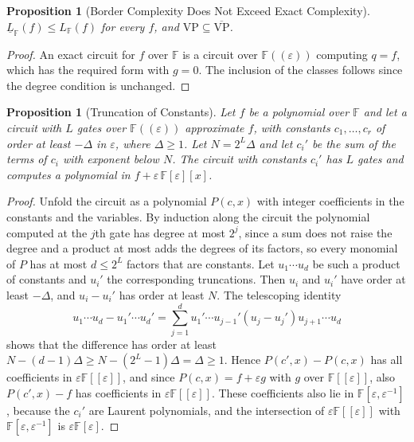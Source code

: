 \documentclass[11pt,letterpaper]{report}
\theoremstyle{plain}
\newtheorem{proposition}[theorem]{Proposition}
\theoremstyle{definition}
\theoremstyle{remark}
\newcommand{\VP}{\mathrm{VP}}
\begin{document}
\begin{proposition}[Border Complexity Does Not Exceed Exact Complexity]\label{pr:borderleq}
$\underline L_{\mathbb F}(f)\le L_{\mathbb F}(f)$ for every $f$, and $\VP\subseteq\overline{\VP}$.
\end{proposition}
\begin{proof}
An exact circuit for $f$ over $\mathbb F$ is a circuit over $\mathbb F((\varepsilon))$ computing $q=f$, which has the required form with $g=0$. The inclusion of the classes follows since the degree condition is unchanged.
\end{proof}

\begin{proposition}[Truncation of Constants]\label{pr:truncate}
Let $f$ be a polynomial over $\mathbb F$ and let a circuit with $L$ gates over $\mathbb F((\varepsilon))$ approximate $f$, with constants $c_1,\dots,c_r$ of order at least $-\Delta$ in $\varepsilon$, where $\Delta\ge1$. Let $N=2^L\Delta$ and let $c_i'$ be the sum of the terms of $c_i$ with exponent below $N$. The circuit with constants $c_i'$ has $L$ gates and computes a polynomial in $f+\varepsilon\,\mathbb F[\varepsilon][x]$.
\end{proposition}
\begin{proof}
Unfold the circuit as a polynomial $P(c,x)$ with integer coefficients in the constants and the variables. By induction along the circuit the polynomial computed at the $j$th gate has degree at most $2^j$, since a sum does not raise the degree and a product at most adds the degrees of its factors, so every monomial of $P$ has at most $d\le2^L$ factors that are constants. Let $u_1\cdots u_d$ be such a product of constants and $u_i'$ the corresponding truncations. Then $u_i$ and $u_i'$ have order at least $-\Delta$, and $u_i-u_i'$ has order at least $N$. The telescoping identity
\[
u_1\cdots u_d-u_1'\cdots u_d'=\sum_{j=1}^du_1'\cdots u_{j-1}'(u_j-u_j')u_{j+1}\cdots u_d
\]
shows that the difference has order at least $N-(d-1)\Delta\ge N-(2^L-1)\Delta=\Delta\ge1$. Hence $P(c',x)-P(c,x)$ has all coefficients in $\varepsilon\mathbb F[[\varepsilon]]$, and since $P(c,x)=f+\varepsilon g$ with $g$ over $\mathbb F[[\varepsilon]]$, also $P(c',x)-f$ has coefficients in $\varepsilon\mathbb F[[\varepsilon]]$. These coefficients also lie in $\mathbb F[\varepsilon,\varepsilon^{-1}]$, because the $c_i'$ are Laurent polynomials, and the intersection of $\varepsilon\mathbb F[[\varepsilon]]$ with $\mathbb F[\varepsilon,\varepsilon^{-1}]$ is $\varepsilon\mathbb F[\varepsilon]$.
\end{proof}
\end{document}
